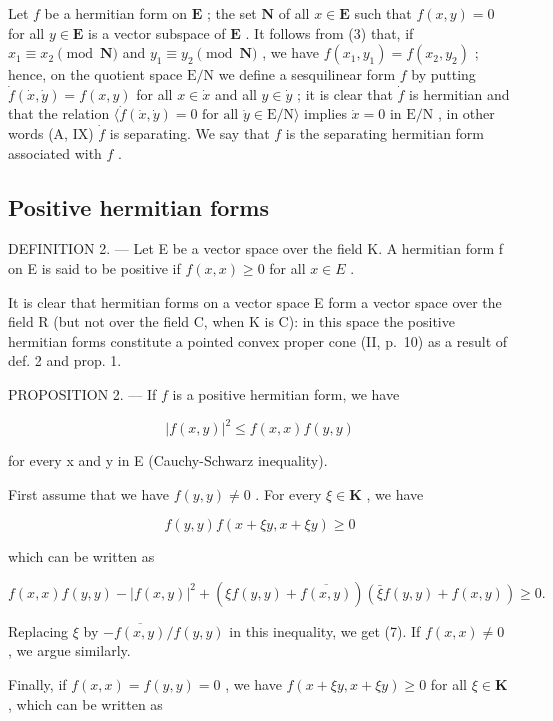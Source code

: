 Let \(f\) be a hermitian form on \(\mathbf{E}\) ; the set \(\mathbf{N}\) of all \(x \in \mathbf{E}\) such that \(f(x, y) = 0\) for all \(y \in \mathbf{E}\) is a vector subspace of \(\mathbf{E}\) . It follows from (3) that, if \(x_1 \equiv x_2 \pmod{\mathbf{N}}\) and \(y_1 \equiv y_2 \pmod{\mathbf{N}}\) , we have \(f(x_1, y_1) = f(x_2, y_2)\) ; hence, on the quotient space \(\mathrm{E/N}\) we define a sesquilinear form \(f\) by putting \(\dot{f}(\dot{x}, \dot{y}) = f(x, y)\) for all \(x \in \dot{x}\) and all \(y \in \dot{y}\) ; it is clear that \(\dot{f}\) is hermitian and that the relation \(\langle \dot{f}(\dot{x}, \dot{y}) = 0 \text{ for all } \dot{y} \in \mathrm{E/N} \rangle\) implies \(\dot{x} = 0 \text{ in } \mathrm{E/N}\) , in other words (A, IX) \(\dot{f}\) is separating. We say that \(f\) is the separating hermitian form associated with \(f\) .

\subsection{Positive hermitian forms}

DEFINITION 2. --- Let E be a vector space over the field K. A hermitian form f on E is said to be positive if \(f(x, x) \geqslant 0\) for all \(x \in E\) .

It is clear that hermitian forms on a vector space E form a vector space over the field R (but not over the field C, when K is C): in this space the positive hermitian forms constitute a pointed convex proper cone (II, p.~10) as a result of def. 2 and prop. 1.

PROPOSITION 2. --- If \(f\) is a positive hermitian form, we have

\[
\left| f (x, y) \right| ^ {2} \leqslant f (x, x) f (y, y)\tag{7}
\]

for every x and y in E (Cauchy-Schwarz inequality).

First assume that we have \(f(y, y) \neq 0\) . For every \(\xi \in \mathbf{K}\) , we have

\[
f (y, y) f (x + \xi y, x + \xi y) \geqslant 0
\]

which can be written as

\[
f (x, x) f (y, y) - | f (x, y) | ^ {2} + (\xi f (y, y) + \overline {{f (x , y)}}) (\bar {\xi} f (y, y) + f (x, y)) \geqslant 0.
\]

Replacing \(\xi\) by \(-\overline{f(x,y)} / f(y,y)\) in this inequality, we get (7). If \(f(x,x)\neq 0\) , we argue similarly.

Finally, if \(f(x, x) = f(y, y) = 0\) , we have \(f(x + \xi y, x + \xi y) \geqslant 0\) for all \(\xi \in \mathbf{K}\) , which can be written as

